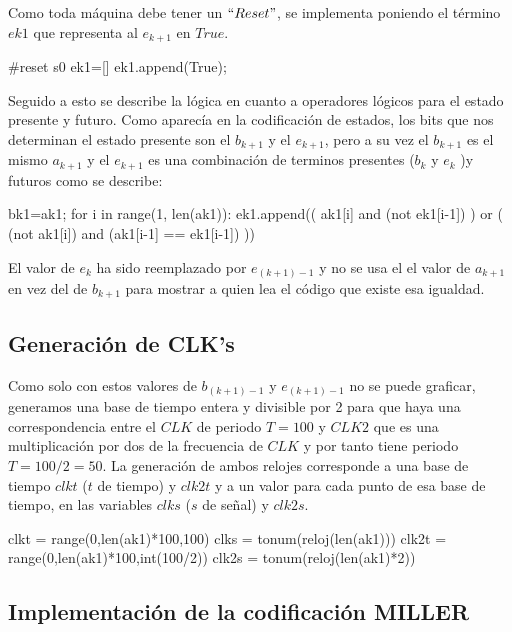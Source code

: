 \documentclass{article}
\begin{document}
Como toda máquina debe tener un $``Reset"$, se implementa poniendo el término $ek1$ que representa al $e_{k+1}$ en $True$.

\begin{python}
#reset s0
ek1=[]
ek1.append(True);
\end{python}

Seguido a esto se describe la lógica en cuanto a operadores lógicos para el estado presente y futuro. Como aparecía en la codificación de estados, los bits que nos determinan el estado presente son el $b_{k+1}$ y el $e_{k+1}$, pero a su vez el $b_{k+1}$ es el mismo $a_{k+1}$ y el $e_{k+1}$ es una combinación de terminos presentes ($b_{k}$ y $e_{k}$ )y futuros como se describe:

\begin{python}
bk1=ak1;
for i in range(1, len(ak1)):
    ek1.append(( ak1[i] and (not ek1[i-1]) ) or
        ( (not ak1[i]) and (ak1[i-1] == ek1[i-1]) ))
\end{python}

El valor de $e_{k}$ ha sido reemplazado por $e_{(k+1)-1}$  y no se usa el el valor de $a_{k+1}$ en vez del de $b_{k+1}$ para mostrar a quien lea el código que existe esa igualdad.

\subsection{Generación de CLK's}

Como solo con estos valores de $b_{(k+1)-1}$ y $e_{(k+1)-1}$ no se puede graficar, generamos una base de tiempo entera y divisible por 2 para que haya una correspondencia entre el $CLK$ de periodo $T=100$ y $CLK2$ que es una multiplicación por dos de la frecuencia de $CLK$ y por tanto tiene periodo $T=100/2=50$. La generación de ambos relojes corresponde a una base de tiempo $clkt$ ($t$ de tiempo) y $clk2t$ y a un valor para cada punto de esa base de tiempo, en las variables $clks$ ($s$ de señal) y $clk2s$.

\begin{python}
clkt = range(0,len(ak1)*100,100)
clks = tonum(reloj(len(ak1)))
clk2t = range(0,len(ak1)*100,int(100/2))
clk2s = tonum(reloj(len(ak1)*2))
\end{python}

\subsection{Implementación de la codificación MILLER}
\end{document}
